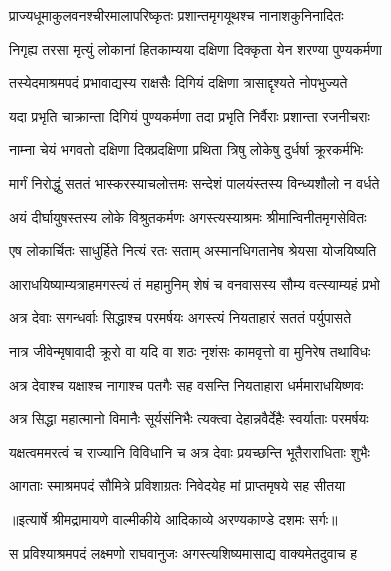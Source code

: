 \twolineshloka
{प्राज्यधूमाकुलवनश्चीरमालापरिष्कृतः}
{प्रशान्तमृगयूथश्च नानाशकुनिनादितः} %

\twolineshloka
{निगृह्य तरसा मृत्युं लोकानां हितकाम्यया}
{दक्षिणा दिक्कृता येन शरण्या पुण्यकर्मणा} %

\twolineshloka
{तस्येदमाश्रमपदं प्रभावाद्यस्य राक्षसैः}
{दिगियं दक्षिणा त्रासाद्दृश्यते नोपभुज्यते} %

\twolineshloka
{यदा प्रभृति चाक्रान्ता दिगियं पुण्यकर्मणा}
{तदा प्रभृति निर्वैराः प्रशान्ता रजनीचराः} %

\twolineshloka
{नाम्ना चेयं भगवतो दक्षिणा दिक्प्रदक्षिणा}
{प्रथिता त्रिषु लोकेषु दुर्धर्षा क्रूरकर्मभिः} %

\twolineshloka
{मार्गं निरोद्धुं सततं भास्करस्याचलोत्तमः}
{सन्देशं पालयंस्तस्य विन्ध्यशौलो न वर्धते} %

\twolineshloka
{अयं दीर्घायुषस्तस्य लोके विश्रुतकर्मणः}
{अगस्त्यस्याश्रमः श्रीमान्विनीतमृगसेवितः} %

\twolineshloka
{एष लोकार्चितः साधुर्हिते नित्यं रतः सताम्}
{अस्मानधिगतानेष श्रेयसा योजयिष्यति} %

\twolineshloka
{आराधयिष्याम्यत्राहमगस्त्यं तं महामुनिम्}
{शेषं च वनवासस्य सौम्य वत्स्याम्यहं प्रभो} %

\twolineshloka
{अत्र देवाः सगन्धर्वाः सिद्धाश्च परमर्षयः}
{अगस्त्यं नियताहारं सततं पर्युपासते} %

\twolineshloka
{नात्र जीवेन्मृषावादी क्रूरो वा यदि वा शठः}
{नृशंसः कामवृत्तो वा मुनिरेष तथाविधः} %

\twolineshloka
{अत्र देवाश्च यक्षाश्च नागाश्च पतगैः सह}
{वसन्ति नियताहारा धर्ममाराधयिष्णवः} %

\twolineshloka
{अत्र सिद्धा महात्मानो विमानैः सूर्यसंनिभैः}
{त्यक्त्वा देहान्नवैर्देहैः स्वर्याताः परमर्षयः} %

\twolineshloka
{यक्षत्वममरत्वं च राज्यानि विविधानि च}
{अत्र देवाः प्रयच्छन्ति भूतैराराधिताः शुभैः} %

\twolineshloka
{आगताः स्माश्रमपदं सौमित्रे प्रविशाग्रतः}
{निवेदयेह मां प्राप्तमृषये सह सीतया} %


{॥इत्यार्षे श्रीमद्रामायणे वाल्मीकीये आदिकाव्ये अरण्यकाण्डे दशमः सर्गः॥}


\twolineshloka
{स प्रविश्याश्रमपदं लक्ष्मणो राघवानुजः}
{अगस्त्यशिष्यमासाद्य वाक्यमेतदुवाच ह} %

